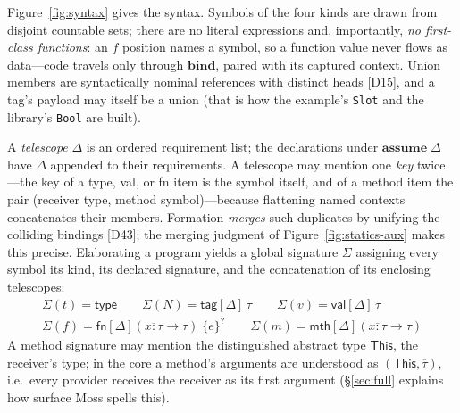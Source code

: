\documentclass[10pt]{article}
\newcommand{\ov}[1]{\overline{#1}}
\newcommand{\kw}[1]{\mathbf{#1}}          %
\newcommand{\ksf}[1]{\mathsf{#1}}         %
\newcommand{\This}{\ksf{This}}
\newcommand{\smallcode}[1]{\texttt{\small #1}}
\theoremstyle{plain}
\theoremstyle{remark}
\begin{document}
Figure~\ref{fig:syntax} gives the syntax. Symbols of the four kinds are
drawn from disjoint countable sets; there are no literal expressions and,
importantly, \emph{no first-class functions}: an $f$ position names a
symbol, so a function value never flows as data---code travels only
through $\kw{bind}$, paired with its captured context. Union members are
syntactically nominal references with distinct heads [D15], and a tag's
payload may itself be a union (that is how the example's \smallcode{Slot}
and the library's \smallcode{Bool} are built).

A \emph{telescope} $\Delta$ is an ordered requirement list; the
declarations under $\kw{assume}\;\Delta$ have $\Delta$ appended to their
requirements. A telescope may mention one \emph{key} twice---the key of a
type, val, or fn item is the symbol itself, and of a method item the pair
(receiver type, method symbol)---because flattening named contexts
concatenates their members. Formation \emph{merges} such duplicates by
unifying the colliding bindings [D43]; the merging judgment of
Figure~\ref{fig:statics-aux} makes this precise. Elaborating a program yields a global signature $\Sigma$
assigning every symbol its kind, its declared signature, and the
concatenation of its enclosing telescopes:
\[
\begin{array}{c}
\Sigma(t) = \ksf{type} \qquad
\Sigma(N) = \ksf{tag}[\Delta]\,\tau \qquad
\Sigma(v) = \ksf{val}[\Delta]\,\tau \\[2pt]
\Sigma(f) = \ksf{fn}[\Delta](\ov{x{:}\tau} \to \tau)\;\{e\}^? \qquad
\Sigma(m) = \ksf{mth}[\Delta](\ov{x{:}\tau} \to \tau)
\end{array}
\]
A method signature may mention the distinguished abstract type $\This$,
the receiver's type; in the core a method's arguments are understood as
$(\This, \ov{\tau})$, i.e.\ every provider receives the receiver as its
first argument (\S\ref{sec:full} explains how surface Moss spells this).
\end{document}
